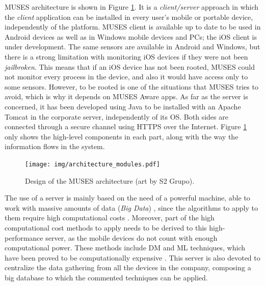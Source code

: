 MUSES architecture is shown in Figure \ref{fig:architecture}. %
It is a \textit{client/server} approach in which the \textit{client} application can be installed in every user's mobile or portable device, independently of the platform. MUSES client is available up to date to be used in Android devices as well as in Windows mobile devices and PCs; the iOS client is under development. The same sensors are available in Android and Windows, but there is a strong limitation with monitoring iOS devices if they were not been \textit{jailbroken}. This means that if an iOS device has not been rooted, MUSES could not monitor every process in the device, and also it would have access only to some sensors. However, to be rooted is one of the situations that MUSES tries to avoid, which is why it depends on MUSES Aware apps. %
As far as the server is concerned, it has been developed using Java to be installed with an Apache Tomcat in the corporate server, independently of its OS. %
Both sides are connected through a secure channel using HTTPS over the Internet. Figure \ref{fig:architecture} only shows the high-level components in each part, along with the way the information flows in the system. %

\begin{figure}[ht]
\hspace{-0.7in}
\texttt{[image: img/architecture\_modules.pdf]}
\caption{Design of the MUSES architecture (art by S2 Grupo). \label{fig:architecture}}
\end{figure}

The use of a server is mainly based on the need of a powerful machine, able to work with massive amounts of data (\textit{Big Data}) \cite{BigData_11}, since the algorithms to apply to them require high computational costs \cite{Shirkhorshidi14Review}.
Moreover, part of the high computational cost methods to apply needs to be derived to this high-performance server, as the mobile devices do not count with enough computational power. These methods include DM \cite{DataMining_Lee01} and ML \cite{MachineLearning_Bishop06} techniques, which have been proved to be computationally expensive \cite{Cios07DataMining}. This server is also devoted to centralize the data gathering from all the devices in the company, composing a big database to which the commented techniques can be applied.


